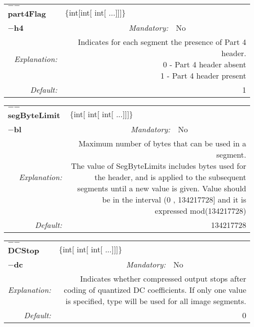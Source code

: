 \begin{center}\begin{tabular}{|rr|rlrl|}
\hline
\multicolumn{2}{|l|}{\textbf{$-$$-$part4Flag}} & \multicolumn{4}{|l|}{$\{$int$[$int$[$ int$[$ ...$]$$]$$]$$\}$} \\
\cline{3-6}
\multicolumn{2}{|l|}{\textbf{$-$h4}} & \emph{Mandatory:} & No & &  \\
\hline
\emph{Explanation:} & \multicolumn{5}{|p{12cm}|}{Indicates for each segment the presence of Part 4 header.\newline 0 - Part 4 header absent\newline 1 - Part 4 header present} \\
\hline
\emph{Default:} & \multicolumn{5}{|p{12cm}|}{1 } \\
\hline
\end{tabular}\end{center}
\begin{center}\begin{tabular}{|rr|rlrl|}
\hline
\multicolumn{2}{|l|}{\textbf{$-$$-$segByteLimit}} & \multicolumn{4}{|l|}{$\{$int$[$ int$[$ int$[$ ...$]$$]$$]$$\}$} \\
\cline{3-6}
\multicolumn{2}{|l|}{\textbf{$-$bl}} & \emph{Mandatory:} & No & &  \\
\hline
\emph{Explanation:} & \multicolumn{5}{|p{12cm}|}{Maximum number of bytes that can be used in a segment.\newline The value of SegByteLimits includes bytes used for the header, and is applied to the subsequent segments until a new value is given. Value should be in the interval (0 , 134217728] and it is expressed mod(134217728)} \\
\hline
\emph{Default:} & \multicolumn{5}{|p{12cm}|}{134217728 } \\
\hline
\end{tabular}\end{center}
\begin{center}\begin{tabular}{|rr|rlrl|}
\hline
\multicolumn{2}{|l|}{\textbf{$-$$-$DCStop}} & \multicolumn{4}{|l|}{$\{$int$[$ int$[$ int$[$ ...$]$$]$$]$$\}$} \\
\cline{3-6}
\multicolumn{2}{|l|}{\textbf{$-$dc}} & \emph{Mandatory:} & No & &  \\
\hline
\emph{Explanation:} & \multicolumn{5}{|p{12cm}|}{Indicates whether compressed output stops after coding of quantized DC coefficients.  If only one value is specified, type will be used for all image segments.} \\
\hline
\emph{Default:} & \multicolumn{5}{|p{12cm}|}{0 } \\
\hline
\end{tabular}\end{center}
